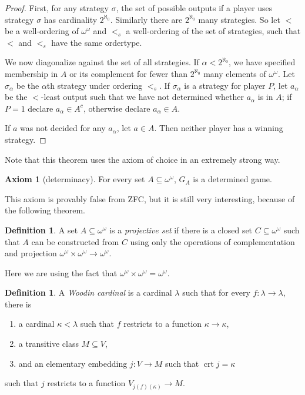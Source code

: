 \documentclass[12pt]{report}
\DeclareMathOperator{\crt}{crt}
\newcommand{\dfn}[1]{\emph{#1}\index{#1}}
\theoremstyle{definition}
\newtheorem{axiom}[theorem]{Axiom}
\newtheorem{definition}[theorem]{Definition}
\begin{document}
\begin{proof}
First, for any strategy $\sigma$, the set of possible outputs if a player uses strategy $\sigma$ has cardinality $2^{\aleph_0}$. Similarly there are $2^{\aleph_0}$ many strategies.
So let $<$ be a well-ordering of $\omega^\omega$ and $<_s$ a well-ordering of the set of strategies, such that $<$ and $<_s$ have the same ordertype.

We now diagonalize against the set of all strategies. If $\alpha < 2^{\aleph_0}$, we have specified membership in $A$ or its complement for fewer than $2^{\aleph_0}$ many elements of $\omega^\omega$.
Let $\sigma_\alpha$ be the $\alpha$th strategy under ordering $<_s$. If $\sigma_\alpha$ is a strategy for player $P$, let $a_\alpha$ be the $<$-least output such that we have not determined whether $a_\alpha$ is in $A$; if $P = 1$ declare $a_\alpha \in A^c$, otherwise declare $a_\alpha \in A$.

If $a$ was not decided for any $a_\alpha$, let $a \in A$. Then neither player has a winning strategy.
\end{proof}
Note that this theorem uses the axiom of choice in an extremely strong way.
\begin{axiom}[determinacy]
For every set $A \subseteq \omega^\omega$, $G_A$ is a determined game.
\end{axiom}
This axiom is provably false from ZFC, but it is still very interesting, because of the following theorem.
\begin{definition}
A set $A \subseteq \omega^\omega$ is a \dfn{projective set} if there is a closed set $C \subseteq \omega^\omega$ such that $A$ can be constructed from $C$ using only the operations of complementation and projection $\omega^\omega \times \omega^\omega \to \omega^\omega$.
\end{definition}
Here we are using the fact that $\omega^\omega \times \omega^\omega = \omega^\omega$.
\begin{definition}
A \dfn{Woodin cardinal} is a cardinal $\lambda$ such that for every $f: \lambda \to \lambda$, there is
\begin{enumerate}
\item a cardinal $\kappa < \lambda$ such that $f$ restricts to a function $\kappa \to \kappa$,
\item a transitive class $M \subseteq V$,
\item and an elementary embedding $j: V \to M$ such that $\crt j = \kappa$
\end{enumerate}
such that $j$ restricts to a function $V_{j(f)(\kappa)} \to M$.
\end{definition}
\end{document}
